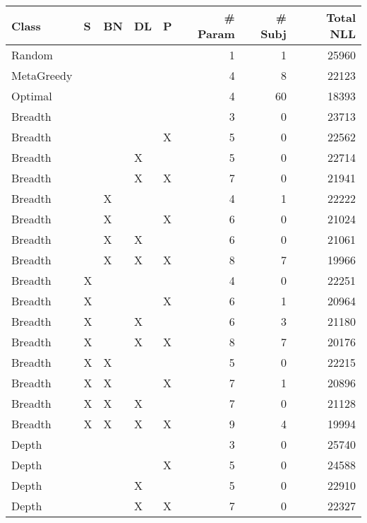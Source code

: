 \begin{tabular}{lllllrrr}
\toprule
      Class &  S & BN & DL &  P &  \# Param &  \# Subj &  Total NLL \\
\midrule
     Random &    &    &    &    &        1 &       1 &      25960 \\
 MetaGreedy &    &    &    &    &        4 &       8 &      22123 \\
    Optimal &    &    &    &    &        4 &      60 &      18393 \\
    Breadth &    &    &    &    &        3 &       0 &      23713 \\
    Breadth &    &    &    &  X &        5 &       0 &      22562 \\
    Breadth &    &    &  X &    &        5 &       0 &      22714 \\
    Breadth &    &    &  X &  X &        7 &       0 &      21941 \\
    Breadth &    &  X &    &    &        4 &       1 &      22222 \\
    Breadth &    &  X &    &  X &        6 &       0 &      21024 \\
    Breadth &    &  X &  X &    &        6 &       0 &      21061 \\
    Breadth &    &  X &  X &  X &        8 &       7 &      19966 \\
    Breadth &  X &    &    &    &        4 &       0 &      22251 \\
    Breadth &  X &    &    &  X &        6 &       1 &      20964 \\
    Breadth &  X &    &  X &    &        6 &       3 &      21180 \\
    Breadth &  X &    &  X &  X &        8 &       7 &      20176 \\
    Breadth &  X &  X &    &    &        5 &       0 &      22215 \\
    Breadth &  X &  X &    &  X &        7 &       1 &      20896 \\
    Breadth &  X &  X &  X &    &        7 &       0 &      21128 \\
    Breadth &  X &  X &  X &  X &        9 &       4 &      19994 \\
      Depth &    &    &    &    &        3 &       0 &      25740 \\
      Depth &    &    &    &  X &        5 &       0 &      24588 \\
      Depth &    &    &  X &    &        5 &       0 &      22910 \\
      Depth &    &    &  X &  X &        7 &       0 &      22327 \\

\end{tabular}
